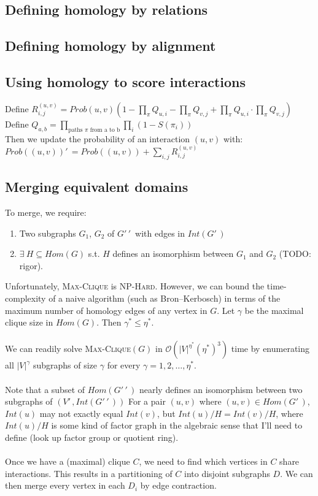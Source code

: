 \documentclass[11pt]{article}
\begin{document}
\subsection*{Defining homology by relations}

\subsection*{Defining homology by alignment}

\subsection*{Using homology to score interactions}

Define
$R_{i,j}^{(u,v)} = Prob(u,v) \left(1 - \displaystyle \prod_\pi Q_{u,i} - \prod_\pi Q_{v,j} + \prod_\pi Q_{u,i} \cdot \prod_\pi Q_{v,j} \right)$\\
Define $Q_{a,b} = \displaystyle \prod_{\text{paths } \pi \text{ from a to b}} \prod_{i} (1 - S(\pi_i))$\\
Then we update the probability of an interaction $(u,v)$ with:\\
$Prob((u,v))'\,\! = Prob((u,v)) + \displaystyle \sum_{i,j} R_{i,j}^{(u,v)}$

\subsection*{Merging equivalent domains}

To merge, we require:
\begin{enumerate}
\item Two subgraphs $G_1$, $G_2$ of $G'\,\!'\,\!$ with edges in $Int(G'\,\!)$
\item $\exists \: H \subseteq Hom(G)$ s.t. $H$ defines an isomorphism between $G_1$ and $G_2$ (TODO: rigor).
\end{enumerate}
Unfortunately, \textsc{Max-Clique} is \textsc{NP-Hard}. However, we can bound the time-complexity of a naive algorithm (such as Bron--Kerbosch) in terms of the maximum number of homology edges of any vertex in $G$. Let $\gamma$ be the maximal clique size in $Hom(G)$. Then $\gamma^* \leq \eta^*$.\\\\
We can readily solve \textsc{Max-Clique}$(G)$ in $\mathcal O(|V|^{\eta^*}(\eta^*)^3)$ time by enumerating all $|V|^{\gamma}$ subgraphs of size $\gamma$ for every $\gamma = 1, 2, \ldots, \eta^*$.\\\\
Note that a subset of $Hom(G'\,\!'\,\!)$ nearly defines an isomorphism between two subgraphs of $(V'\,\!, Int(G'\,\!'\,\!))$ For a pair $(u,v)$ where $(u,v) \in Hom(G'\,\!)$, $Int(u)$ may not exactly equal $Int(v)$, but $Int(u) / H = Int(v) / H$, where $Int(u) / H$ is some kind of factor graph in the algebraic sense that I'll need to define (look up factor group or quotient ring).\\\\
Once we have a (maximal) clique $C$, we need to find which vertices in $C$ share interactions. This results in a partitioning of $C$ into disjoint subgraphs $D$. We can then merge every vertex in each $D_i$ by edge contraction.
\end{document}
